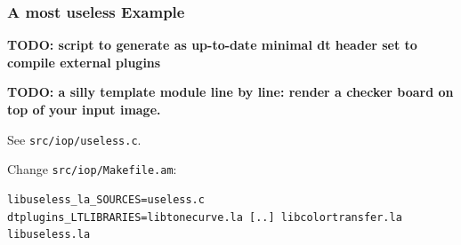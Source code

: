 \documentclass[a4paper,twoside]{scrartcl}
\newcommand{\todo}[1]{{\color{red}\bf TODO: #1}}
\newcommand{\code}[1]{\texttt{\color{codecol}#1}}
\begin{document}
\subsubsection{A most useless Example}


\todo{script to generate as up-to-date minimal dt header set to compile external plugins}

\todo{a silly template module line by line: render a checker board on top of your input image.}

See \code{src/iop/useless.c}.

Change \code{src/iop/Makefile.am}:
\begin{verbatim}
libuseless_la_SOURCES=useless.c
dtplugins_LTLIBRARIES=libtonecurve.la [..] libcolortransfer.la libuseless.la
\end{verbatim}
\end{document}
